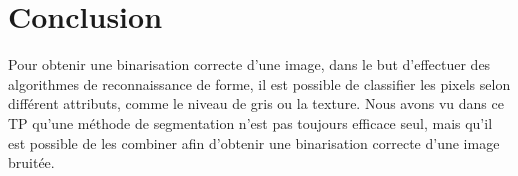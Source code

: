 \documentclass[11pt]{article}
\begin{document}
  \section*{Conclusion}
  Pour obtenir une binarisation correcte d'une image, dans le but d'effectuer des algorithmes de reconnaissance de forme, il est possible
  de classifier les pixels selon différent attributs, comme le niveau de gris ou la texture. Nous avons vu dans ce TP qu'une méthode de 
  segmentation n'est pas toujours efficace seul, mais qu'il est possible de les combiner afin d'obtenir une binarisation correcte 
  d'une image bruitée.
\end{document}
